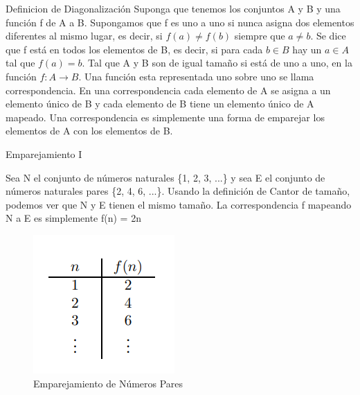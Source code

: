 \documentclass[11pt]{beamer}
\begin{document}
		
		\begin{frame}{Definicion de Diagonalización}
			\justifying
			Suponga que tenemos los conjuntos A y B y una función f de A a B.
            Supongamos que f es uno a uno si nunca asigna dos elementos diferentes al mismo lugar, es decir, si $f(a) \neq f(b)$ siempre que $a \neq b$. Se dice que f está en todos los elementos de B, es decir, si para cada $b \in B$ hay un $a \in A$ tal que $f(a) = b$. Tal que A y B son de igual tamaño si está de uno a uno, en la función $f: A \to B$. Una función esta representada uno sobre uno se llama correspondencia. En una correspondencia cada elemento de A se asigna a un elemento único de B y cada elemento de B tiene un elemento único de A mapeado.
            Una correspondencia es simplemente una forma de emparejar los elementos de A con los elementos de B.
		\end{frame}
		
		
		\begin{frame}{Emparejamiento I}
			\begin{multicols}{2}
			    \justifying
                Sea N el conjunto de números naturales \{1, 2, 3, ...\} y sea E el conjunto de números naturales pares \{2, 4, 6, ...\}. Usando la definición de Cantor de tamaño, podemos ver que N y E tienen el mismo tamaño. La correspondencia f mapeando N a E es simplemente f(n) = 2n
                \columnbreak
                
                \begin{figure}[H]
    				\centering
    				\includegraphics[scale=0.7]{img/inde_emparejam_1.png}
    				\caption{Emparejamiento de Números Pares}
    				\label{fig: inde_emparejam_1}
    			\end{figure}
                
            \end{multicols}
		\end{frame}
		
\end{document}
